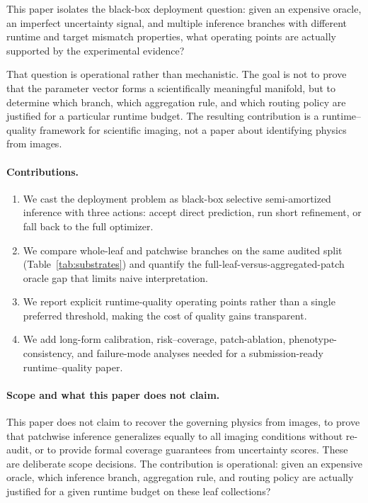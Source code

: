\documentclass[11pt,a4paper]{article}
\begin{document}
This paper isolates the black-box deployment question: given an expensive oracle, an imperfect uncertainty signal, and multiple inference branches with different runtime and target mismatch properties, what operating points are actually supported by the experimental evidence?

That question is operational rather than mechanistic.
The goal is not to prove that the parameter vector forms a scientifically meaningful manifold, but to determine which branch, which aggregation rule, and which routing policy are justified for a particular runtime budget.
The resulting contribution is a runtime--quality framework for scientific imaging, not a paper about identifying physics from images.

\paragraph{Contributions.}
\begin{enumerate}[leftmargin=1.5em,itemsep=2pt]
\item We cast the deployment problem as black-box selective semi-amortized inference with three actions: accept direct prediction, run short refinement, or fall back to the full optimizer.
\item We compare whole-leaf and patchwise branches on the same audited split (Table~\ref{tab:substrates}) and quantify the full-leaf-versus-aggregated-patch oracle gap that limits naive interpretation.
\item We report explicit runtime-quality operating points rather than a single preferred threshold, making the cost of quality gains transparent.
\item We add long-form calibration, risk--coverage, patch-ablation, phenotype-consistency, and failure-mode analyses needed for a submission-ready runtime--quality paper.
\end{enumerate}

\paragraph{Scope and what this paper does not claim.}
This paper does not claim to recover the governing physics from images, to prove that patchwise inference generalizes equally to all imaging conditions without re-audit, or to provide formal coverage guarantees from uncertainty scores. These are deliberate scope decisions. The contribution is operational: given an expensive oracle, which inference branch, aggregation rule, and routing policy are actually justified for a given runtime budget on these leaf collections?
\end{document}
